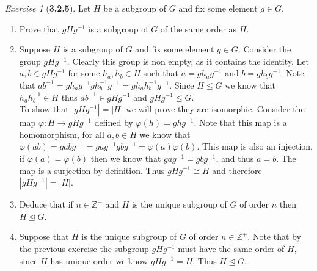 \documentclass[12pt]{amsart}
\makeatletter
\theoremstyle{remark}
\newtheorem*{exercise}{Exercise}%
\def\ZZ{\ensuremath{\mathbb Z}}
\renewenvironment{proof}[1][\proofname]{\par\doublespacing
  \pushQED{\qed}%
  \normalfont \topsep6\p@\@plus6\p@\relax
  \list{}{%
    \settowidth{\leftmargin}{\itshape\proofname:\hskip\labelsep}%
    \setlength{\labelwidth}{0pt}%
    \setlength{\itemindent}{-\leftmargin}%
  }%
  \item[\hskip\labelsep\itshape#1\@addpunct{:}]\ignorespaces
}{%
  \popQED\endlist\@endpefalse
  \singlespacing
}
\theoremstyle{mycomment}
\makeatother
\begin{document}
\begin{exercise}[\textbf{3.2.5}] Let $H$ be a subgroup of $G$ and fix some element $g \in G$.
  \begin{enumerate}
    \item[a] Prove that $gHg^{-1}$ is a subgroup of $G$ of the same order as $H$.\\
    \begin{proof} Suppose $H$ is a subgroup of $G$ and fix some element $g \in G$. Consider the group $gHg^{-1}$. Clearly this 
      group is non empty, as it contains the identity. Let $a, b \in gHg^{-1}$ for some $h_a, h_b \in H$ such that $a = gh_ag^{-1}$ and 
      $b = gh_bg^{-1}$. Note that $ab^{-1} = gh_ag^{-1}gh_b^{-1}g^{-1} = gh_ah_b^{-1}g^{-1}$. Since $H \leq G$ we know that $h_ah_b^{-1} \in H$ thus 
      $ab^{-1} \in gHg^{-1}$ and $gHg^{-1} \leq G$.\\
      To show that $|gHg^{-1}| = |H|$ we will prove they are isomorphic. Consider the map $\varphi: H \to gHg^{-1}$ defined by $\varphi(h) = ghg^{-1}$.
      Note that this map is a homomorphism, for all $a, b \in H$ we know that $\varphi(ab) = gabg^{-1} = gag^{-1}gbg^{-1} = \varphi(a)\varphi(b)$. This map is also an injection, if $\varphi(a) = \varphi(b)$ then we know that $gag^{-1} = gbg^{-1}$, and thus $a = b$. The map is a surjection by definition. Thus $gHg^{-1} \cong H$ and therefore $|gHg^{-1}| = |H|$.
    \end{proof}
    \vspace{.15in}
    \item[b] Deduce that if $n \in \ZZ^+$ and $H$ is the unique subgroup of $G$ of order $n$ then $H \trianglelefteq G$.\\
    \begin{proof} Suppose that $H$ is the unique subgroup of $G$ of order $n \in \ZZ^+$. Note that by the previous exercise the 
      subgroup $gHg^{-1}$ must have the same order of $H$, since $H$ has unique order we know $gHg^{-1} = H$. Thus  $H \trianglelefteq G$.
    \end{proof} 
  \end{enumerate}
\end{exercise}
\vspace{.15in}








  
\end{document}
